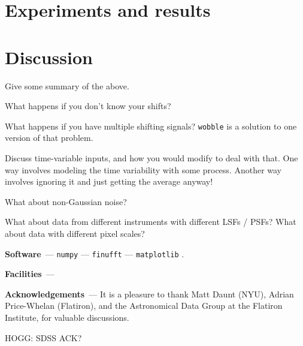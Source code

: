 \documentclass[11pt]{article}
\renewcommand{\paragraph}[1]{\medskip\par\noindent\textbf{#1}~---}
\begin{document}
\section{Experiments and results}

\section{Discussion}

Give some summary of the above.

What happens if you don't know your shifts?

What happens if you have multiple shifting signals?
\texttt{wobble} \cite{wobble} is a solution to one version of that problem.

Discuss time-variable inputs, and how you would modify to deal with that.
One way involves modeling the time variability with some process.
Another way involves ignoring it and just getting the average anyway!

What about non-Gaussian noise?

What about data from different instruments with different LSFs / PSFs? What about data with different pixel scales?

\paragraph{Software}
\texttt{numpy} \cite{numpy} ---
\texttt{finufft} \cite{finufft} ---
\texttt{matplotlib} \cite{matplotlib}.

\paragraph{Facilities}

\paragraph{Acknowledgements}
It is a pleasure to thank
Matt Daunt (NYU),
Adrian Price-Whelan (Flatiron),
and the Astronomical Data Group at the Flatiron Institute,
for valuable discussions.

HOGG: SDSS ACK?
\end{document}
